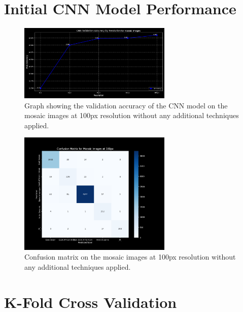 \begin{appendices}
	\section{Initial CNN Model Performance}
	\label{app:initial_cnn_performance}

	\begin{figure}[H]
		\centering
		\includegraphics[width=0.65\textwidth]{../imgs/graphs/cnn_validation_accuracy_mosaics_line.png}
		\caption{Graph showing the validation accuracy of the CNN model on the mosaic images at 100px resolution without any
			additional techniques applied.}
		\label{fig:initial_accuracy_mosaic}
	\end{figure}

	\begin{figure}[H]
		\centering
		\includegraphics[width=0.65\textwidth]{../imgs/graphs/cnn_confusion_matrix_mosaics_100px.png}
		\caption{Confusion matrix on the mosaic images at 100px resolution without any additional techniques applied.}
		\label{fig:initial_confusion_matrix_mosaic}
	\end{figure}

	\section{K-Fold Cross Validation}
	\label{app:kfold_cross_validation}


\end{appendices}
